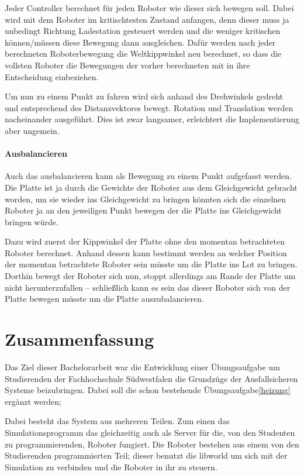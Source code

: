 {Jeder Controller berechnet f{\"{u}}r jeden Roboter wie dieser sich bewegen soll. Dabei wird mit dem Roboter
im kritischtesten Zustand anfangen, denn dieser muss ja unbedingt Richtung Ladestation gesteuert werden 
und die weniger kritischen k{\"{o}}nnen/m{\"{u}}ssen diese Bewegung dann ausgleichen. Daf{\"{u}}r werden nach
jeder berechneten Roboterbewegung die Weltkippwinkel neu berechnet, so dass die vollsten Roboter die Bewegungen
der vorher berechneten mit in ihre Entscheidung einbeziehen.


Um nun zu einem Punkt zu fahren wird sich anhand des Drehwinkels gedreht und entsprechend des Distanzvektores 
bewegt. Rotation und Translation werden nacheinander ausgef{\"{u}}hrt. Dies ist zwar langsamer, erleichtert die
Implementierung aber ungemein.

\paragraph{Ausbalancieren} Auch das ausbalancieren kann als Bewegung zu einem Punkt aufgefasst werden.
Die Platte ist ja durch die Gewichte der Roboter aus dem Gleichgewicht gebracht worden, um sie wieder ins
Gleichgewicht zu bringen k{\"{o}}nnten sich die einzelnen Roboter ja an den jeweiligen Punkt bewegen der
die Platte ins Gleichgewicht bringen w{\"{u}}rde.

Dazu wird zuerst der Kippwinkel der Platte ohne den momentan betrachteten Roboter berechnet. Anhand dessen
kann bestimmt werden an welcher Position der momentan betrachtete Roboter sein m{\"{u}}sste um die Platte
ins Lot zu bringen. Dorthin bewegt der Roboter sich nun, stoppt allerdings am Rande der Platte um nicht
herunterzufallen -- schlie{\ss}lich kann es sein das dieser Roboter sich von der Platte bewegen m{\"{u}}sste
um die Platte auszubalancieren.

\clearpage
\section{Zusammenfassung}
Das Ziel dieser Bachelorarbeit war die Entwicklung einer {\"{U}}bungsaufgabe um Studierenden der Fachhochschule
S{\"{u}}dwestfalen die Grundz{\"{u}}ge der Ausfallsicheren Systeme beizubringen. Dabei soll die schon bestehende
{\"{U}}bungsaufgabe\ref{heizung} erg{\"{a}}nzt werden; \todo{}

Dabei besteht das System aus mehreren Teilen. Zum einen das Simulationsprogramm das gleichzeitig auch als
Server f{\"{u}}r die, von den Studenten zu programmierenden, Roboter fungiert. Die Roboter bestehen aus
einem von den Studierenden programmierten Teil; dieser benutzt die libworld um sich mit der Simulation zu
verbinden und die Roboter in ihr zu steuern.

}
